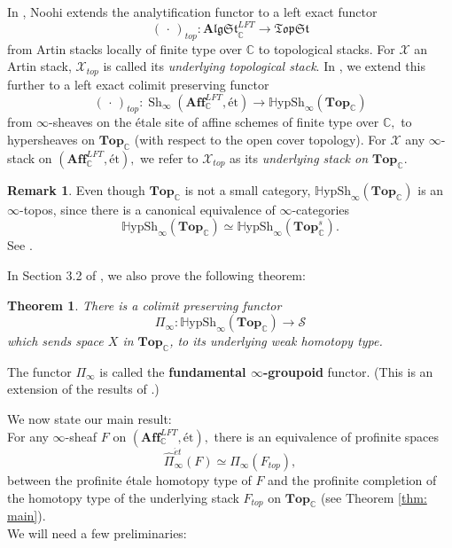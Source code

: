 \documentclass[12pt]{amsart}
\newtheorem{theorem}[dummy]{Theorem}
\theoremstyle{definition}
\newtheorem{remark}[dummy]{Remark}
\newcommand{\bC}{\mathbb{C}}
\newcommand{\cS}{\mathcal{S}}
\newcommand{\cX}{\mathcal{X}}
\newcommand{\Aff}{\mathbf{Aff}^{\mathit{LFT}}_{\mathbb{C}}}
\newcommand{\TopC}{\Top_\mathbb{C}}
\newcommand{\TopCs}{\TopC^s}
\newcommand{\Sh}{\operatorname{Sh}}
\newcommand{\et}{\acute{e}t}
\def\Top{\mathbf{Top}}
\renewcommand{\i}{\infty}
\def\Shi{\Sh_\i}
\def\Hshi{\mathbb{H}\mathrm{ypSh}_\i}
\def\blank{\mspace{3mu}\cdot\mspace{3mu}}
\def\Top{\mathbf{Top}}
\begin{document}
In \cite[Section 20]{No1}, Noohi extends the analytification functor to a left exact functor
$$\left(\blank\right)_{top}:\mathbf{A}\!\mathfrak{lgSt}^{LFT}_{\mathbb{C}} \to \mathfrak{TopSt}$$ from Artin stacks locally of finite type over $\mathbb{C}$ to topological stacks. For $\cX$ an Artin stack, $\cX_{top}$ is called its \emph{underlying topological stack}. In \cite[Theorem 3.1 and Corollary 3.11]{knhom}, we extend this further to a left exact colimit preserving functor
$$\left(\blank\right)_{top}:\Shi\left(\Aff,\mbox{\'et}\right) \to \Hshi\left(\TopC\right)$$
from $\i$-sheaves on the \'etale site of affine schemes of finite type over $\bC,$ to hypersheaves on $\TopC$ (with respect to the open cover topology). For $\cX$ any $\i$-stack on $\left(\Aff,\mbox{\'et}\right),$ we refer to $\cX_{top}$ as its \emph{underlying stack on $\TopC$}.

\begin{remark}\label{rmk: topos small}
Even though $\TopC$ is not a small category, $\Hshi\left(\TopC\right)$ is an $\i$-topos, since there is a canonical equivalence of $\i$-categories
$$\Hshi\left(\TopC\right) \simeq \Hshi\left(\TopCs\right).$$ See \cite[Section 3.1]{knhom}.
\end{remark}

In Section 3.2 of \cite{knhom}, we also prove the following theorem:

\begin{theorem}\cite[Proposition 3.12 and Corollary 3.13]{knhom}
There is a colimit preserving functor $$\Pi_\i:\Hshi\left(\TopC\right) \to \cS$$ which sends space $X$ in $\TopC$, to its underlying weak homotopy type.
\end{theorem}

The functor $\Pi_\i$ is called the \textbf{fundamental $\i$-groupoid} functor. (This is an extension of the results of \cite{No2}.)

We now state our main result:\\

For any $\i$-sheaf $F$ on $\left(\Aff,\mbox{\'et}\right),$ there is an equivalence of profinite spaces $$\widehat{\Pi}^{\et}_\i\left(F\right) \simeq \widehat{\Pi}_\i\left(F_{top}\right),$$ between the profinite \'etale homotopy type of $F$ and the profinite completion of the homotopy type of the underlying stack $F_{top}$ on $\TopC$ (see Theorem \ref{thm: main}).\\

We will need a few preliminaries:\\
\end{document}
